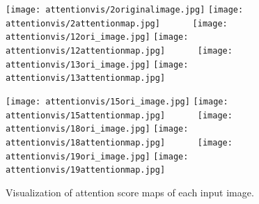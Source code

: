 \documentclass{article}
\theoremstyle{plain}
\theoremstyle{definition}
\theoremstyle{remark}
\begin{document}
\begin{figure}[h]
   \centering
\texttt{[image: attentionvis/2originalimage.jpg]}
\texttt{[image: attentionvis/2attentionmap.jpg]}
\ \ \ \ \ \ 
  \texttt{[image: attentionvis/12ori\_image.jpg]}
\texttt{[image: attentionvis/12attentionmap.jpg]}
\ \ \ \ \ \ 
\texttt{[image: attentionvis/13ori\_image.jpg]}
\texttt{[image: attentionvis/13attentionmap.jpg]}
\ \ \ \ \ \   

\texttt{[image: attentionvis/15ori\_image.jpg]}
\texttt{[image: attentionvis/15attentionmap.jpg]}
\ \ \ \ \ \ 
\texttt{[image: attentionvis/18ori\_image.jpg]}
\texttt{[image: attentionvis/18attentionmap.jpg]}
\ \ \ \ \ \ 
\texttt{[image: attentionvis/19ori\_image.jpg]}
\texttt{[image: attentionvis/19attentionmap.jpg]}
\ \ \ \ \ \ 
  \vspace{-1mm}
  \caption{Visualization of    attention score maps of each input image.}
  \label{fig:attenscoresss}
  \vspace{-2.5mm}
\end{figure}
\end{document}
